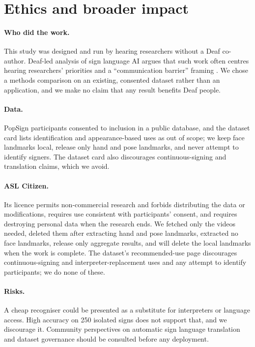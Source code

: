 \section{Ethics and broader impact}
\label{sec:ethics}
\paragraph{Who did the work.} This study was designed and run by hearing researchers without a Deaf co-author. Deaf-led
analysis of sign language AI argues that such work often centres hearing researchers' priorities and a ``communication
barrier'' framing \citep{desai2024biases}. We chose a methods comparison on an existing, consented dataset rather than an
application, and we make no claim that any result benefits Deaf people.

\paragraph{Data.} PopSign participants consented to inclusion in a public database, and the dataset card lists identification
and appearance-based uses as out of scope; we keep face landmarks local, release only hand and pose landmarks, and never
attempt to identify signers. The dataset card also discourages continuous-signing and translation claims, which we avoid.

\paragraph{ASL Citizen.} Its licence permits non-commercial research and forbids distributing the data or modifications, requires use consistent with participants' consent,
and requires destroying personal data when the research ends. We fetched only the videos needed, deleted them after extracting hand and pose landmarks, extracted no face landmarks, release only aggregate results,
and will delete the local landmarks when the work is complete. The dataset's recommended-use page discourages continuous-signing and interpreter-replacement uses and any attempt to identify participants; we do none of these.

\paragraph{Risks.} A cheap recogniser could be presented as a substitute for interpreters or language access. High accuracy
on 250 isolated signs does not support that, and we discourage it. Community perspectives on automatic sign language
translation \citep{tran2023assets} and dataset governance \citep{bragg2021fate} should be consulted before any deployment.

